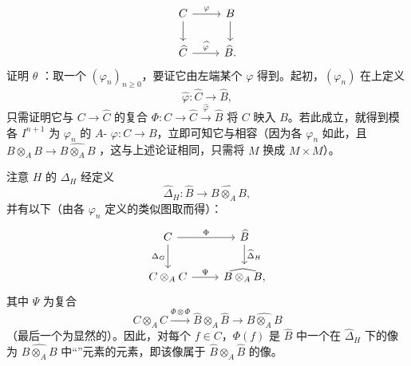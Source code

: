 \[
\begin{tikzcd}
C\arrow[r,"\varphi"]\arrow[d]&B\arrow[d]\\
\widehat C\arrow[r,"\widehat\varphi"]&\widehat B.
\end{tikzcd}
\]
证明 $\theta$ ：取一个 $(\varphi_n)_{n\geq0}$，要证它由左端某个 $\varphi$ 得到。起初，$(\varphi_n)$ 在上定义
\[\widehat\varphi:\widehat C\longrightarrow\widehat B,\]
只需证明它与 $C\to\widehat C$ 的复合 $\Phi:C\to\widehat C\xrightarrow{\widehat\varphi}\widehat B$ 将 $C$ 映入 $B$。若此成立，就得到模各 $I^{n+1}$ 为 $\varphi_n$ 的 $A$- $\varphi:C\to B$，立即可知它与相容（因为各 $\varphi_n$ 如此，且 $B\otimes_A B\to\widehat{B\otimes_A B}$ ，这与上述论证相同，只需将 $M$ 换成 $M\times M$）。

注意 $H$ 的 $\Delta_H$ 经定义
\[\widehat\Delta_H:\widehat B\longrightarrow\widehat{B\otimes_A B},\]
并有以下（由各 $\varphi_n$ 定义的类似图取而得）：
\[
\begin{tikzcd}
C\arrow[r,"\Phi"]\arrow[d,"\Delta_G"']&\widehat B\arrow[d,"\widehat\Delta_H"]\\
C\otimes_A C\arrow[r,"\Psi"]&\widehat{B\otimes_A B},
\end{tikzcd}
\]
其中 $\Psi$ 为复合
\[C\otimes_A C\xrightarrow{\Phi\otimes\Phi}\widehat B\otimes_A\widehat B\longrightarrow\widehat{B\otimes_A B}\]
（最后一个为显然的）。因此，对每个 $f\in C$，$\Phi(f)$ 是 $\widehat B$ 中一个在 $\widehat\Delta_H$ 下的像为 $\widehat{B\otimes_A B}$ 中“”元素的元素，即该像属于 $\widehat B\otimes_A\widehat B$ 的像。

